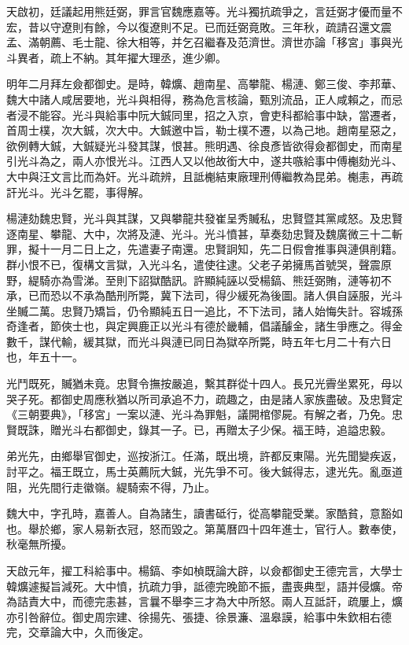 \begin{pinyinscope}
天啟初，廷議起用熊廷弼，罪言官魏應嘉等。光斗獨抗疏爭之，言廷弼才優而量不宏，昔以守遼則有餘，今以復遼則不足。已而廷弼竟敗。三年秋，疏請召還文震孟、滿朝薦、毛士龍、徐大相等，并乞召繼春及范濟世。濟世亦論「移宮」事與光斗異者，疏上不納。其年擢大理丞，進少卿。

明年二月拜左僉都御史。是時，韓爌、趙南星、高攀龍、楊漣、鄭三俊、李邦華、魏大中諸人咸居要地，光斗與相得，務為危言核論，甄別流品，正人咸賴之，而忌者浸不能容。光斗與給事中阮大鋮同里，招之入京，會吏科都給事中缺，當遷者，首周士樸，次大鋮，次大中。大鋮邀中旨，勒士樸不遷，以為己地。趙南星惡之，欲例轉大鋮，大鋮疑光斗發其謀，恨甚。熊明遇、徐良彥皆欲得僉都御史，而南星引光斗為之，兩人亦恨光斗。江西人又以他故銜大中，遂共嗾給事中傅櫆劾光斗、大中與汪文言比而為奸。光斗疏辨，且詆櫆結東廠理刑傅繼教為昆弟。櫆恚，再疏訐光斗。光斗乞罷，事得解。

楊漣劾魏忠賢，光斗與其謀，又與攀龍共發崔呈秀贓私，忠賢暨其黨咸怒。及忠賢逐南星、攀龍、大中，次將及漣、光斗。光斗憤甚，草奏劾忠賢及魏廣微三十二斬罪，擬十一月二日上之，先遣妻子南還。忠賢詗知，先二日假會推事與漣俱削籍。群小恨不已，復構文言獄，入光斗名，遣使往逮。父老子弟擁馬首號哭，聲震原野，緹騎亦為雪涕。至則下詔獄酷訊。許顯純誣以受楊鎬、熊廷弼賄，漣等初不承，已而恐以不承為酷刑所斃，冀下法司，得少緩死為後圖。諸人俱自誣服，光斗坐贓二萬。忠賢乃矯旨，仍令顯純五日一追比，不下法司，諸人始悔失計。容城孫奇逢者，節俠士也，與定興鹿正以光斗有德於畿輔，倡議醵金，諸生爭應之。得金數千，謀代輸，緩其獄，而光斗與漣已同日為獄卒所斃，時五年七月二十有六日也，年五十一。

光鬥既死，贓猶未竟。忠賢令撫按嚴追，繫其群從十四人。長兄光霽坐累死，母以哭子死。都御史周應秋猶以所司承追不力，疏趣之，由是諸人家族盡破。及忠賢定《三朝要典》，「移宮」一案以漣、光斗為罪魁，議開棺僇屍。有解之者，乃免。忠賢既誅，贈光斗右都御史，錄其一子。已，再贈太子少保。福王時，追謚忠毅。

弟光先，由鄉舉官御史，巡按浙江。任滿，既出境，許都反東陽。光先聞變疾返，討平之。福王既立，馬士英薦阮大鋮，光先爭不可。後大鋮得志，逮光先。亂亟道阻，光先間行走徽嶺。緹騎索不得，乃止。

魏大中，字孔時，嘉善人。自為諸生，讀書砥行，從高攀龍受業。家酷貧，意豁如也。舉於鄉，家人易新衣冠，怒而毀之。第萬曆四十四年進士，官行人。數奉使，秋毫無所擾。

天啟元年，擢工科給事中。楊鎬、李如楨既論大辟，以僉都御史王德完言，大學士韓爌遽擬旨減死。大中憤，抗疏力爭，詆德完晚節不振，盡喪典型，語并侵爌。帝為詰責大中，而德完恚甚，言曩不舉李三才為大中所怒。兩人互詆訐，疏屢上，爌亦引咎辭位。御史周宗建、徐揚先、張捷、徐景濂、溫皋謨，給事中朱欽相右德完，交章論大中，久而後定。


\end{pinyinscope}
